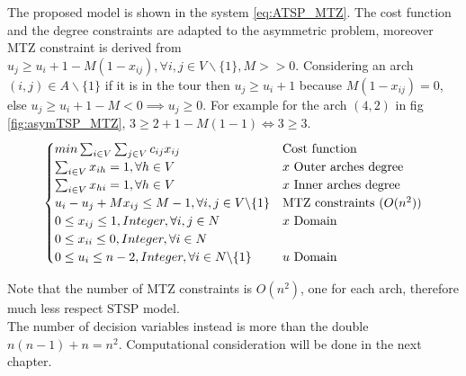 The proposed model is shown in the system \ref{eq:ATSP_MTZ}. The cost function and the degree constraints are adapted to the asymmetric problem, moreover MTZ constraint is derived from $ u_j \ge u_i+1-M(1-x_{ij}), \forall i,j \in V \backslash \{1\}, M >> 0 $. Considering an arch $ (i,j) \in A \backslash \{1\} $ if it is in the tour then $ u_j \ge u_i + 1 $ because $ M(1-x_{ij}) = 0 $, else $ u_j \ge u_i + 1 - M < 0 \implies u_j \ge 0 $. For example for the arch $ (4,2) $ in fig \ref{fig:asymTSP_MTZ}, $ 3 \ge 2 + 1 - M(1-1) \iff 3 \ge 3 $. \\

\begin{equation}
\begin{cases}
min \sum_{i\in V}\sum_{j\in V} c_{ij}x_{ij} & \text{Cost function} \\
\sum_{i\in V} x_{ih} = 1, \forall h \in V  & \text{$ x $ Outer arches degree} \\
\sum_{i\in V} x_{hi} = 1, \forall h \in V  & \text{$ x $ Inner arches degree} \\
u_i -u_j +M x_{ij} \le M - 1, \forall i,j \in V \backslash \{1\} & \text{MTZ constraints ($ O(n^2) $)} \\
0 \le x_{ij} \le 1, Integer, \forall i,j \in N  & \text{$ x $ Domain} \\
0 \le x_{ii} \le 0, Integer, \forall i \in N  & \text{} \\
0 \le u_{i} \le n-2, Integer, \forall i \in N \backslash \{1\} & \text{$ u $ Domain} 
\end{cases}
\label{eq:ATSP_MTZ}
\end{equation}


Note that the number of MTZ constraints is $ O(n^2) $, one for each arch, therefore much less respect STSP model.\\
The number of decision variables instead is more than the double $ n(n-1) + n = n^2 $. Computational consideration will be done in the next chapter.

